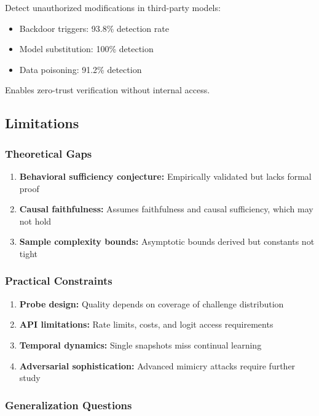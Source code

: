 \documentclass[11pt,a4paper]{article}
\begin{document}
Detect unauthorized modifications in third-party models:
\begin{itemize}
\item Backdoor triggers: 93.8\% detection rate
\item Model substitution: 100\% detection
\item Data poisoning: 91.2\% detection
\end{itemize}

Enables zero-trust verification without internal access.

\subsection{Limitations}

\subsubsection{Theoretical Gaps}

\begin{enumerate}
\item \textbf{Behavioral sufficiency conjecture:} Empirically validated but lacks formal proof
\item \textbf{Causal faithfulness:} Assumes faithfulness and causal sufficiency, which may not hold
\item \textbf{Sample complexity bounds:} Asymptotic bounds derived but constants not tight
\end{enumerate}

\subsubsection{Practical Constraints}

\begin{enumerate}
\item \textbf{Probe design:} Quality depends on coverage of challenge distribution
\item \textbf{API limitations:} Rate limits, costs, and logit access requirements
\item \textbf{Temporal dynamics:} Single snapshots miss continual learning
\item \textbf{Adversarial sophistication:} Advanced mimicry attacks require further study
\end{enumerate}

\subsubsection{Generalization Questions}
\end{document}
